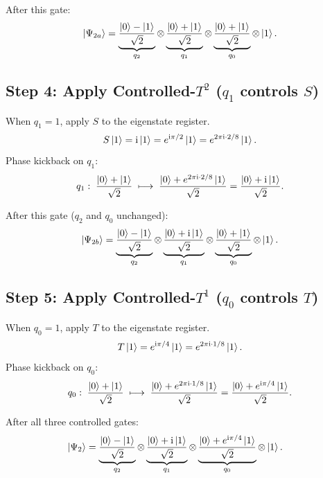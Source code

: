 \documentclass[12pt,a4paper]{article}
\newcommand{\ii}{\mathrm{i}}
\begin{document}
After this gate:
\[
  \Ket{\Psi_{2a}}
  = \underbrace{\frac{\Ket{0}-\Ket{1}}{\sqrt{2}}}_{q_2}
    \otimes
    \underbrace{\frac{\Ket{0}+\Ket{1}}{\sqrt{2}}}_{q_1}
    \otimes
    \underbrace{\frac{\Ket{0}+\Ket{1}}{\sqrt{2}}}_{q_0}
    \otimes\Ket{1}.
\]

\subsection{Step 4: Apply Controlled-\texorpdfstring{$T^2$}{T\^{}2} (\texorpdfstring{$q_1$}{q1} controls \texorpdfstring{$S$}{S})}

When $q_1=1$, apply $S$ to the eigenstate register.
\[
  S\Ket{1} = \ii\Ket{1} = e^{\ii\pi/2}\Ket{1} = e^{2\pi\ii\cdot 2/8}\Ket{1}.
\]
Phase kickback on $q_1$:
\[
  q_1:\;\frac{\Ket{0}+\Ket{1}}{\sqrt{2}}
  \;\longmapsto\;
  \frac{\Ket{0}+e^{2\pi\ii\cdot 2/8}\Ket{1}}{\sqrt{2}}
  = \frac{\Ket{0}+\ii\Ket{1}}{\sqrt{2}}.
\]

After this gate ($q_2$ and $q_0$ unchanged):
\[
  \Ket{\Psi_{2b}}
  = \underbrace{\frac{\Ket{0}-\Ket{1}}{\sqrt{2}}}_{q_2}
    \otimes
    \underbrace{\frac{\Ket{0}+\ii\Ket{1}}{\sqrt{2}}}_{q_1}
    \otimes
    \underbrace{\frac{\Ket{0}+\Ket{1}}{\sqrt{2}}}_{q_0}
    \otimes\Ket{1}.
\]

\subsection{Step 5: Apply Controlled-\texorpdfstring{$T^1$}{T\^{}1} (\texorpdfstring{$q_0$}{q0} controls \texorpdfstring{$T$}{T})}

When $q_0=1$, apply $T$ to the eigenstate register.
\[
  T\Ket{1} = e^{\ii\pi/4}\Ket{1} = e^{2\pi\ii\cdot 1/8}\Ket{1}.
\]
Phase kickback on $q_0$:
\[
  q_0:\;\frac{\Ket{0}+\Ket{1}}{\sqrt{2}}
  \;\longmapsto\;
  \frac{\Ket{0}+e^{2\pi\ii\cdot 1/8}\Ket{1}}{\sqrt{2}}
  = \frac{\Ket{0}+e^{\ii\pi/4}\Ket{1}}{\sqrt{2}}.
\]

After all three controlled gates:
\begin{align}
  \Ket{\Psi_2}
  &= \underbrace{\frac{\Ket{0}-\Ket{1}}{\sqrt{2}}}_{q_2}
     \otimes
     \underbrace{\frac{\Ket{0}+\ii\Ket{1}}{\sqrt{2}}}_{q_1}
     \otimes
     \underbrace{\frac{\Ket{0}+e^{\ii\pi/4}\Ket{1}}{\sqrt{2}}}_{q_0}
     \otimes\Ket{1}.
  \label{eq:psi2_product}
\end{align}
\end{document}
